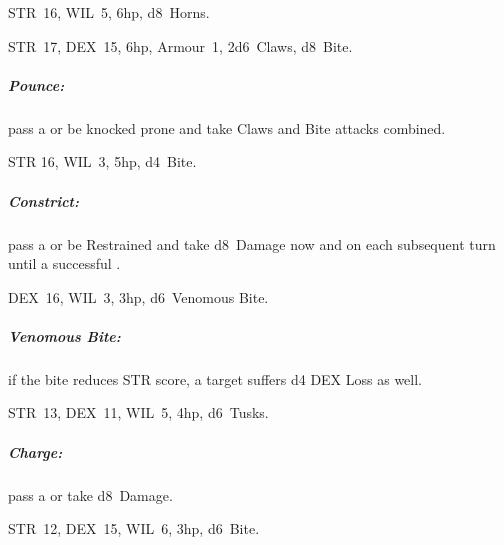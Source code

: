 \documentclass[itdr]{subfiles}
\begin{document}
\vfill

STR~16, WIL~5, 6hp, d8~Horns.

\vfill

STR~17, DEX~15, 6hp, Armour~1, 2d6~Claws, d8~Bite.
\subparagraph{Pounce:} pass a  or be knocked prone and take Claws and Bite attacks combined.

\vfill

STR 16, WIL~3, 5hp, d4~Bite.
\subparagraph{Constrict:} pass a  or be Restrained and take d8~Damage now and on each subsequent turn until a successful .

\vfill

DEX~16, WIL~3, 3hp, d6~Venomous Bite.
\subparagraph{Venomous Bite:} if the bite reduces STR score, a target suffers d4 DEX Loss as well.

\vfill

STR~13, DEX~11, WIL~5, 4hp, d6~Tusks.
\subparagraph{Charge:} pass a  or take d8~Damage.

\vfill

STR~12, DEX~15, WIL~6, 3hp, d6~Bite.

\vfill
~
\end{document}
